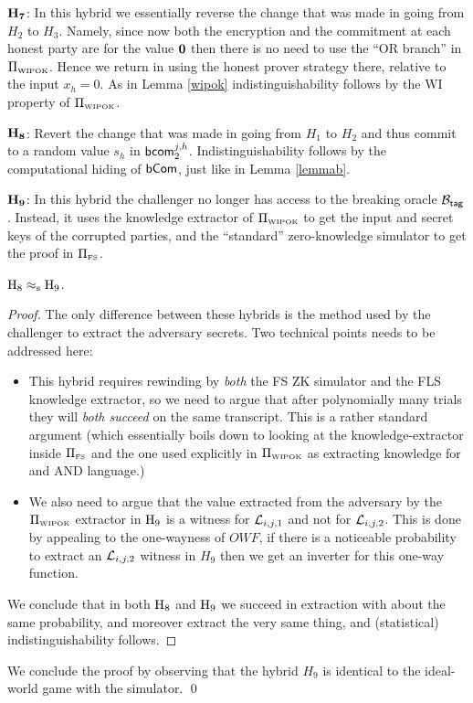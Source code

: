 \smallskip
\item{$\bf H_7$:} In this hybrid we essentially reverse the change that was made in going from $H_2$ to $H_3$. Namely, since now both the encryption and the commitment at each honest party are for the value ${\bf 0}$ then there is no need to use the ``OR branch'' in $\Pi_{{\scriptscriptstyle\mathrm{WIPOK}}}$. Hence we return in using the honest prover strategy there, relative to the input $x_h=0$. As in Lemma \ref{wipok} indistinguishability follows by the WI property of $\Pi_{{\scriptscriptstyle\mathrm{WIPOK}}}$. 

\smallskip
\item{$\bf H_{8}$:} Revert the change that was made in going from $H_1$ to $H_2$ and thus commit to a random value $s_h$ in ${\mathsf{bcom}}_2^{j,h}$.  Indistinguishability follows by the computational hiding of $\mathsf{bCom}$, just like in Lemma \ref{lemmab}.

\smallskip
\item{$\bf H_{9}$:} In this hybrid the challenger no longer has access to the breaking oracle $\mathcal{B}_{\mathsf{tag}}$. Instead, it uses the knowledge extractor of $\Pi_{{\scriptscriptstyle\mathrm{WIPOK}}}$ to get the input and secret keys of the corrupted parties, and the ``standard'' zero-knowledge simulator to get the proof in $\Pi_{{\scriptscriptstyle\mathrm{FS}}}$.

\BL$\mathrm{\mathrm{H}_{8}} \approx_{\mathrm{s}}  \mathrm{\mathrm{H}_{9}}$.\EL

\begin{proof}
  The only difference between these hybrids is the method used by the challenger to extract the adversary secrets. Two technical points needs to be addressed here:
  \begin{itemize}
  \item
    This hybrid requires rewinding by \emph{both} the FS ZK simulator and the FLS knowledge extractor, so we need to argue that after polynomially many trials they will \emph{both succeed} on the same transcript. This is a rather standard argument (which essentially boils down to looking at the knowledge-extractor inside $\Pi_{{\scriptscriptstyle\mathrm{FS}}}$ and the one used explicitly in $\Pi_{{\scriptscriptstyle\mathrm{WIPOK}}}$ as extracting knowledge for and AND language.)

  \item
    We also need to argue that the value extracted from the adversary by the $\Pi_{{\scriptscriptstyle\mathrm{WIPOK}}}$ extractor in $\mathrm{\mathrm{H}_{9}}$ is a witness for ${{\cal L}_{i,j,1}}$ and not for ${{\cal L}_{i,j,2}}$. This is done by appealing to the one-wayness of $OWF$, if there is a noticeable probability to extract an ${{\cal L}_{i,j,2}}$ witness in $H_9$ then we get an inverter for this one-way function.
  \end{itemize}
  We conclude that in both $\mathrm{\mathrm{H}_{8}}$ and $\mathrm{\mathrm{H}_{9}}$ we succeed in extraction with about the same probability, and moreover extract the very same thing, and (statistical) indistinguishability follows.
\end{proof}
\EDE
We conclude the proof by observing that the hybrid $H_9$ is identical to the ideal-world game with the simulator.
\qed

